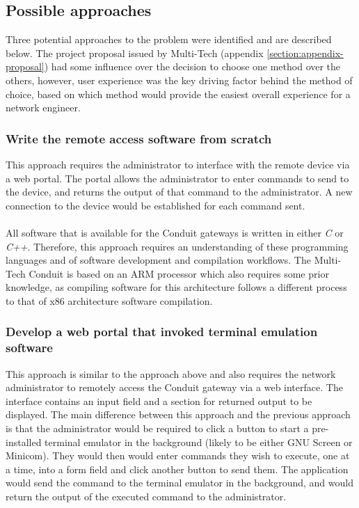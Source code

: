 \subsection{Possible approaches}
\label{subsection:design-methodology-approaches}
Three potential approaches to the problem were identified and are described below. The project proposal issued by Multi-Tech (appendix \ref{section:appendix-proposal}) had some influence over the decision to choose one method over the others, however, user experience was the key driving factor behind the method of choice, based on which method would provide the easiest overall experience for a network engineer. 

\subsubsection{Write the remote access software from scratch}
This approach requires the administrator to interface with the remote device via a web portal. The portal allows the administrator to enter commands to send to the device, and returns the output of that command to the administrator. A new connection to the device would be established for each command sent. \\\\
All software that is available for the Conduit gateways is written in either \textit{C} or \textit{C++}. Therefore, this approach requires an understanding of these programming languages and of software development and compilation workflows. The Multi-Tech Conduit is based on an ARM processor which also requires some prior knowledge, as compiling software for this architecture follows a different process to that of x86 architecture software compilation.

\subsubsection{Develop a web portal that invoked terminal emulation software}
This approach is similar to the approach above and also requires the network administrator to remotely access the Conduit gateway via a web interface. The interface contains an input field and a section for returned output to be displayed. The main difference between this approach and the previous approach is that the administrator would be required to click a button to start a pre-installed terminal emulator in the background (likely to be either GNU Screen or Minicom). They would then would enter commands they wish to execute, one at a time, into a form field and click another button to send them. The application would send the command to the terminal emulator in the background, and would return the output of the executed command to the administrator. 

